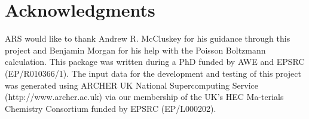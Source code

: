 \documentclass[journal=jacsat,manuscript=article]{achemso}
\begin{document}
\section{Acknowledgments}

ARS would like to thank Andrew R. McCluskey for his guidance through this project and Benjamin Morgan for his help with the Poisson Boltzmann calculation. This package was written during a PhD funded by AWE and EPSRC (EP/R010366/1). The input data for the development and testing of this project was generated using ARCHER UK National Supercomputing Service (http://www.archer.ac.uk) via our membership of the UK's HEC Ma-terials Chemistry Consortium funded by EPSRC (EP/L000202).
%
\end{document}
